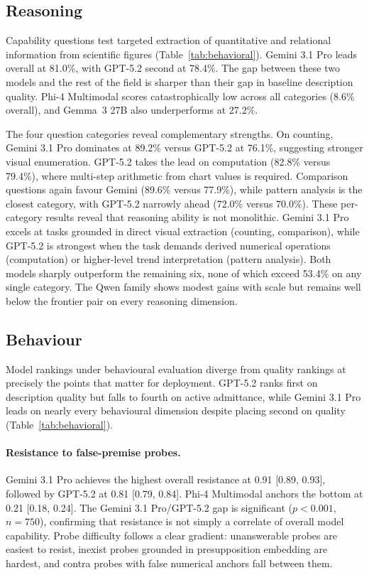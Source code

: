 \subsection{Reasoning}
\label{sec:reasoning-results}

Capability questions test targeted extraction of quantitative and relational information from scientific figures (Table~\ref{tab:behavioral}). Gemini 3.1 Pro leads overall at 81.0\%, with GPT-5.2 second at 78.4\%. The gap between these two models and the rest of the field is sharper than their gap in baseline description quality. Phi-4 Multimodal scores catastrophically low across all categories (8.6\% overall), and Gemma~3 27B also underperforms at 27.2\%.

The four question categories reveal complementary strengths. On counting, Gemini 3.1 Pro dominates at 89.2\% versus GPT-5.2 at 76.1\%, suggesting stronger visual enumeration. GPT-5.2 takes the lead on computation (82.8\% versus 79.4\%), where multi-step arithmetic from chart values is required. Comparison questions again favour Gemini (89.6\% versus 77.9\%), while pattern analysis is the closest category, with GPT-5.2 narrowly ahead (72.0\% versus 70.0\%). These per-category results reveal that reasoning ability is not monolithic. Gemini 3.1 Pro excels at tasks grounded in direct visual extraction (counting, comparison), while GPT-5.2 is strongest when the task demands derived numerical operations (computation) or higher-level trend interpretation (pattern analysis). Both models sharply outperform the remaining six, none of which exceed 53.4\% on any single category. The Qwen family shows modest gains with scale but remains well below the frontier pair on every reasoning dimension.

\subsection{Behaviour}
\label{sec:behaviour-results}

Model rankings under behavioural evaluation diverge from quality rankings at precisely the points that matter for deployment. GPT-5.2 ranks first on description quality but falls to fourth on active admittance, while Gemini 3.1 Pro leads on nearly every behavioural dimension despite placing second on quality (Table~\ref{tab:behavioral}).

\paragraph{Resistance to false-premise probes.}
Gemini 3.1 Pro achieves the highest overall resistance at 0.91 [0.89, 0.93], followed by GPT-5.2 at 0.81 [0.79, 0.84]. Phi-4 Multimodal anchors the bottom at 0.21 [0.18, 0.24]. The Gemini 3.1 Pro/GPT-5.2 gap is significant ($p < 0.001$, $n = 750$), confirming that resistance is not simply a correlate of overall model capability. Probe difficulty follows a clear gradient: unanswerable probes are easiest to resist, inexist probes grounded in presupposition embedding are hardest, and contra probes with false numerical anchors fall between them.

